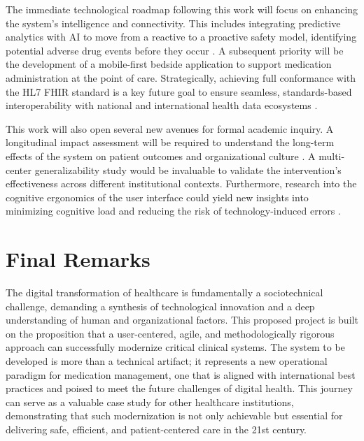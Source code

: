 The immediate technological roadmap following this work will focus on enhancing the system's intelligence and connectivity. This includes integrating predictive analytics with AI to move from a reactive to a proactive safety model, identifying potential adverse drug events before they occur \cite{bates2021,zhao2021}. A subsequent priority will be the development of a mobile-first bedside application to support medication administration at the point of care. Strategically, achieving full conformance with the HL7 FHIR standard is a key future goal to ensure seamless, standards-based interoperability with national and international health data ecosystems \cite{mandl2020}.

This work will also open several new avenues for formal academic inquiry. A longitudinal impact assessment will be required to understand the long-term effects of the system on patient outcomes and organizational culture \cite{greenhalgh2017}. A multi-center generalizability study would be invaluable to validate the intervention's effectiveness across different institutional contexts. Furthermore, research into the cognitive ergonomics of the user interface could yield new insights into minimizing cognitive load and reducing the risk of technology-induced errors \cite{holden2011}.

\section{Final Remarks}

The digital transformation of healthcare is fundamentally a sociotechnical challenge, demanding a synthesis of technological innovation and a deep understanding of human and organizational factors. This proposed project is built on the proposition that a user-centered, agile, and methodologically rigorous approach can successfully modernize critical clinical systems. The system to be developed is more than a technical artifact; it represents a new operational paradigm for medication management, one that is aligned with international best practices and poised to meet the future challenges of digital health. This journey can serve as a valuable case study for other healthcare institutions, demonstrating that such modernization is not only achievable but essential for delivering safe, efficient, and patient-centered care in the 21st century. 
